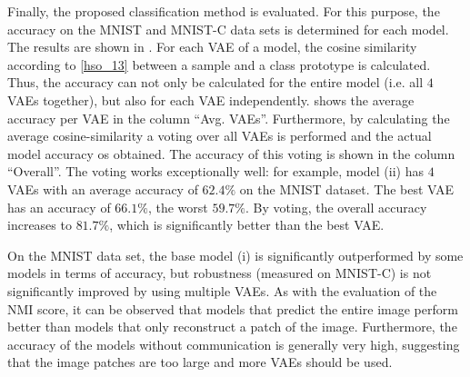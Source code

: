 Finally, the proposed classification method is evaluated. For this purpose, the accuracy on the MNIST and MNIST-C data sets is determined for each model. The results are shown in .
For each VAE of a model, the cosine similarity according to \eqref{hso_13} between a sample and a class prototype is calculated. Thus, the accuracy can not only be calculated for the entire model (i.e. all $4$ VAEs together), but also for each VAE independently.  shows the average accuracy per VAE in the column ``Avg. VAEs''. Furthermore, by calculating the average cosine-similarity a voting over all VAEs is performed and the actual model accuracy os obtained. The accuracy of this voting is shown in the column ``Overall''. The voting works exceptionally well: for example, model (ii) has $4$ VAEs with an average accuracy of $62.4\%$ on the MNIST dataset. The best VAE has an accuracy of $66.1\%$, the worst $59.7\%$. By voting, the overall accuracy increases to $81.7\%$, which is significantly better than the best VAE.

On the MNIST data set, the base model (i) is significantly outperformed by some models in terms of accuracy, but robustness (measured on MNIST-C) is not significantly improved by using multiple VAEs. As with the evaluation of the NMI score, it can be observed that models that predict the entire image perform better than models that only reconstruct a patch of the image. Furthermore, the accuracy of the models without communication is generally very high, suggesting that the image patches are too large and more VAEs should be used.



